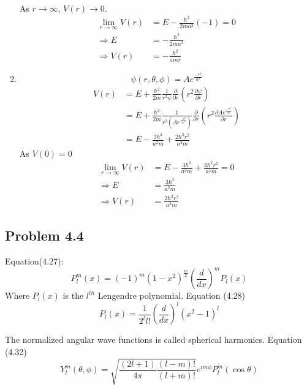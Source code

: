 \documentclass{article}
\begin{document}
\begin{enumerate}[label=(\alph*)]
\begin{align*}
	      \end{align*}
	      As \(r \rightarrow \infty\), \(V(r) \rightarrow 0\).
	      \begin{align*}
		      \lim_{r \to \infty} V(r) & = E - \frac{\hbar^2}{2ma^2} (-1) = 0 \\
		      \Rightarrow E            & = -\frac{\hbar^2}{2ma^2}             \\
		      \Rightarrow V(r)         & = -\frac{\hbar^2}{amr}
	      \end{align*}
	\item
	      \[\psi(r, \theta, \phi) = A e^{\frac{-r^2}{a^2}}\]
	      \begin{align*}
		      V(r) & = E + \frac{\hbar^2}{2m} \frac{1}{r^2 \psi} \frac{\partial}{\partial r } \left(r^2 \frac{\partial \psi}{\partial r}\right)                                       \\
		           & = E + \frac{\hbar^2}{2m} \frac{1}{r^2 (A e^{\frac{-r^2}{a^2}})} \frac{\partial}{\partial r } \left(r^2 \frac{\partial A e^{\frac{-r^2}{a^2}}}{\partial r}\right) \\
		           & = E - \frac{3\hbar^2}{a^2m} + \frac{2\hbar^2 r^2}{a^4 m}
	      \end{align*}
	      As \(V(0) = 0\)
	      \begin{align*}
		      \lim_{r \to \infty} V(r) & = E - \frac{3\hbar^2}{a^2m} + \frac{2\hbar^2 r^2}{a^4 m} = 0 \\
		      \Rightarrow E            & = \frac{3\hbar^2}{a^2m}                                      \\
		      \Rightarrow V(r)         & = \frac{2\hbar^2 r^2}{a^4 m}
	      \end{align*}
\end{enumerate}

\subsection*{Problem 4.4}
Equation(4.27):
\begin{equation*}
	P_l^m (x) = (-1)^m (1-x^2)^{\frac{m}{2}} \left(\frac{d}{dx}\right)^m P_l(x)
\end{equation*}
Where \(P_l(x)\) is the \(l^{th}\) Lengendre polynomial. Equation (4.28) \\
\[P_l(x) = \frac{1}{2^l l!} \left(\frac{d}{dx}\right)^l (x^2 - 1)^l\]

\noindent The normalized angular wave functions is called spherical harmonics. Equation (4.32)
\begin{equation*}
	Y_l^m(\theta, \phi) = \sqrt{\frac{(2l+1)}{4 \pi} \frac{(l - m)!}{(l + m)!}} e^{im \phi} P_l^m(\cos \theta)
\end{equation*}
\end{document}
